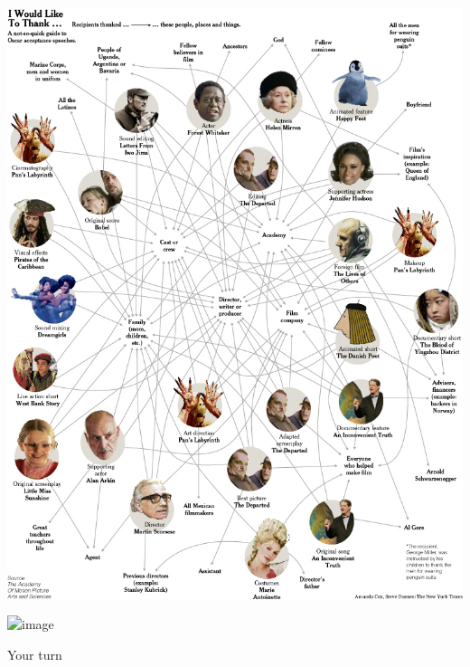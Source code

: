 \documentclass{beamer}
\def\vf{\vfill}
\begin{document}
\begin{frame}

\begin{center}
\includegraphics[height=0.9\textheight]{figures/nytimes_oscar_2007}
\end{center}

\vf
{}

\end{frame}
\begin{frame}

\begin{center}
\includegraphics<1>[width=0.9\textwidth]{figures/trump_network}
\end{center}

\vf
{}

\end{frame}
\begin{frame}

\begin{center}
\Large{Your turn}
\end{center}

\end{frame}
\end{document}
